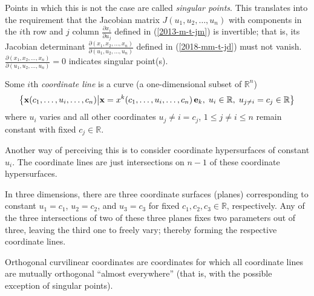 Points
in which this is not the case are called
{\em singular points}.
This translates into the requirement that the
Jacobian matrix
$
J (u_1, u_2,\ldots ,u_n)
$
with components in the $i$th row and $j$ column
$
\frac{\partial x_i}{\partial u_j}
$
defined in (\ref{2013-m-t-jm})
is invertible; that is,
its Jacobian determinant
$
\frac{
\partial
(
x_1, x_2,\ldots ,x_n
)
}{
\partial
(
u_1, u_2,\ldots ,u_n
)
}
$
defined in
(\ref{2018-mm-t-jd})
must not vanish.
$
\frac{
\partial
(
x_1, x_2,\ldots ,x_n
)
}{
\partial
(
u_1, u_2,\ldots ,u_n
)
}
=0
$
indicates singular point(s).

Some $i$th {\em coordinate line}
is a curve  (a one-dimensional subset of $\mathbb{R}^n$)
\begin{equation}
\left\{ {\bf x}(c_1, \ldots ,u_i,\ldots , c_n)
\middle|
{\bf x} = x^k(c_1, \ldots ,u_i,\ldots , c_n) \, {\bf e}_k ,\;
u_i\in \mathbb{R}, \;
u_{j\neq i} = c_j \in \mathbb{R}
\right\}
\label{2018-mm-ch-ten-cl}
\end{equation}
where $u_i$ varies and all other coordinates $u_j{\neq i} = c_j$, $1\le j\neq i\le n$
remain constant with fixed  $c_j \in \mathbb{R}$.

Another way of perceiving this is to consider coordinate hypersurfaces of constant $u_i$.
The coordinate lines are just intersections on $n-1$ of these coordinate hypersurfaces.


In three dimensions, there are  three coordinate surfaces (planes) corresponding to constant
$u_1=c_1$,
$u_2=c_2$, and
$u_3=c_3$ for fixed $c_1,c_2,c_3 \in \mathbb{R}$, respectively.
Any of the three intersections of two of these three planes
fixes two parameters out of three, leaving the third one to freely vary;
thereby forming the respective coordinate lines.






Orthogonal curvilinear coordinates are coordinates for which all coordinate
lines are mutually orthogonal ``almost everywhere''
(that is, with the possible exception of singular points).

